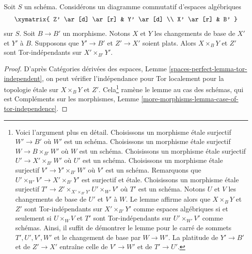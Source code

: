 \begin{lemma}
\label{lemma-case-of-tor-independence}
Soit $S$ un schéma. Considérons un diagramme commutatif d'espaces algébriques
$$
\xymatrix{
Z' \ar[d] \ar[r] & Y' \ar[d] \\
X' \ar[r] & B'
}
$$
sur $S$.
Soit $B \to B'$ un morphisme. Notons $X$ et $Y$ les changements
de base de $X'$ et $Y'$ à $B$.
Supposons que $Y' \to B'$ et $Z' \to X'$ soient plats.
Alors $X \times_B Y$ et $Z'$ sont Tor-indépendants sur $X' \times_{B'} Y'$.
\end{lemma}

\begin{proof}
D'après Catégories dérivées des espaces, Lemme
\ref{spaces-perfect-lemma-tor-independent},
on peut vérifier l'indépendance pour Tor localement pour la topologie \'etale sur $X \times_B Y$
et $Z'$. Cela\footnote{Voici l'argument plus en détail.
Choisissons un morphisme \'etale surjectif $W' \to B'$
où $W'$ est un schéma. Choisissons un morphisme \'etale surjectif
$W \to B \times_{B'} W'$ où $W$ est un schéma. Choisissons un
morphisme \'etale surjectif
$U' \to X' \times_{B'} W'$ où $U'$ est un schéma. Choisissons un
morphisme \'etale surjectif $V' \to Y' \times_{B'} W'$ où $V'$ est un schéma.
Remarquons que $U' \times_{W'} V' \to X' \times_{B'} Y'$ est surjectif et
\'etale. Choisissons un morphisme \'etale surjectif
$T' \to Z' \times_{X' \times_{B'} Y'} U' \times_{W'} V'$
où $T'$ est un schéma. Notons $U$ et $V$ les changements de base de $U'$ et $V'$
à $W$. Le lemme affirme alors que $X \times_B Y$ et $Z'$
sont Tor-indépendants sur $X' \times_{B'} Y'$ comme espaces algébriques
si et seulement si $U \times_W V$ et $T'$ sont Tor-indépendants sur
$U' \times_{W'} V'$ comme schémas. Ainsi,
il suffit de démontrer le lemme pour
le carré de sommets $T', U', V', W'$ et le changement de base par $W \to W'$.
La platitude de $Y' \to B'$ et de $Z' \to X'$ entraîne celle
de $V' \to W'$ et de $T' \to U'$.}
ramène le lemme au cas des schémas,
qui est Compléments sur les morphismes, Lemme
\ref{more-morphisms-lemma-case-of-tor-independence}.
\end{proof}


